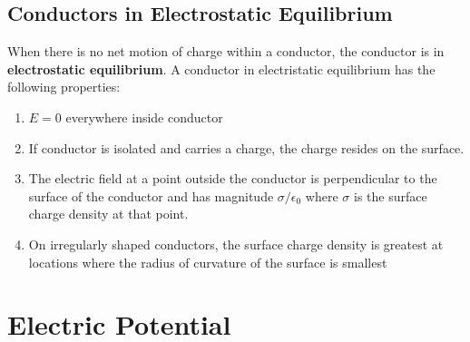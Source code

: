 \documentclass{report}
\begin{document}
	\section{Conductors in Electrostatic Equilibrium}
		When there is no net motion of charge within a conductor, the conductor is in \textbf{electrostatic equilibrium}. A conductor in electristatic equilibrium has the following properties:
		\begin{enumerate}
			\item $E = 0$ everywhere inside conductor
			\item If conductor is isolated and carries a charge, the charge resides on the surface.
			\item The electric field at a point outside the conductor is perpendicular to the surface of the conductor and has magnitude $\sigma/\epsilon_0$ where $\sigma$ is the surface charge density at that point.
			\item On irregularly shaped conductors, the surface charge density is greatest at locations where the radius of curvature of the surface is smallest
		\end{enumerate}
\chapter{Electric Potential}
	\section{}
\end{document}
